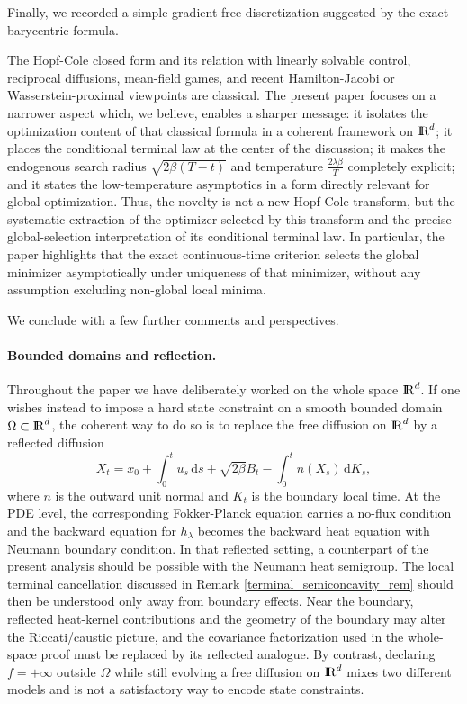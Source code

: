 \documentclass[11pt]{amsart}
\def\R{\mathrm{I\kern-0.21emR}}
\newcommand{\dd}{\,\mathrm{d}}
\numberwithin{equation}{section}
\numberwithin{figure}{section}
\theoremstyle{definition}\newtheorem{remark}[theorem]{Remark}%
\begin{document}
Finally, we recorded a simple gradient-free discretization suggested by the exact barycentric formula.

The Hopf-Cole closed form and its relation with linearly solvable control, reciprocal diffusions, mean-field games, and recent Hamilton-Jacobi or Wasserstein-proximal viewpoints are classical. The present paper focuses on a narrower aspect which, we believe, enables a sharper message: it isolates the optimization content of that classical formula in a coherent framework on $\R^d$; it places the conditional terminal law at the center of the discussion; it makes the endogenous search radius $\sqrt{2\beta(T-t)}$ and temperature $\displaystyle \frac{2\lambda\beta}{T}$ completely explicit; and it states the low-temperature asymptotics in a form directly relevant for global optimization. Thus, the novelty is not a new Hopf-Cole transform, but the systematic extraction of the optimizer selected by this transform and the precise global-selection interpretation of its conditional terminal law. In particular, the paper highlights that the exact continuous-time criterion selects the global minimizer asymptotically under uniqueness of that minimizer, without any assumption excluding non-global local minima.

We conclude with a few further comments and perspectives.

\medskip
\paragraph{\bf Bounded domains and reflection.}
Throughout the paper we have deliberately worked on the whole space $\R^d$. If one wishes instead to impose a hard state constraint on a smooth bounded domain $\Omega \subset \R^d$, the coherent way to do so is to replace the free diffusion on $\R^d$ by a reflected diffusion
$$
X_t = x_0 + \int_0^t u_s \dd s + \sqrt{2\beta}B_t - \int_0^t n(X_s)\dd K_s,
$$
where $n$ is the outward unit normal and $K_t$ is the boundary local time. At the PDE level, the corresponding Fokker-Planck equation carries a no-flux condition and the backward equation for $h_\lambda$ becomes the backward heat equation with Neumann boundary condition. In that reflected setting, a counterpart of the present analysis should be possible with the Neumann heat semigroup. The local terminal cancellation discussed in Remark \ref{terminal_semiconcavity_rem} should then be understood only away from boundary effects. Near the boundary, reflected heat-kernel contributions and the geometry of the boundary may alter the Riccati/caustic picture, and the covariance factorization used in the whole-space proof must be replaced by its reflected analogue. By contrast, declaring $f = +\infty$ outside $\Omega$ while still evolving a free diffusion on $\R^d$ mixes two different models and is not a satisfactory way to encode state constraints.
\end{document}
